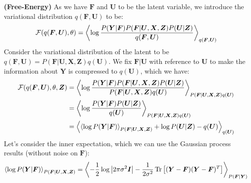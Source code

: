 \begin{remark}{\textbf{(Free-Energy)}}
    As we have $\boldsymbol F$ and $\boldsymbol U$ to be the latent variable, we introduce the variational distribution $q(\boldsymbol F, \boldsymbol U)$ to be:
    \begin{equation*}
        \mathcal{F}(q(\boldsymbol F, \boldsymbol U), \theta) = \left\langle \log\frac{P(\boldsymbol Y|\boldsymbol F)P(\boldsymbol F | \boldsymbol U, \boldsymbol X, \boldsymbol Z)P(\boldsymbol U | \boldsymbol Z)}{q(\boldsymbol F, \boldsymbol U)} \right\rangle_{q(\boldsymbol F, \boldsymbol U)}
    \end{equation*}
    Consider the variational distribution of the latent to be $q(\boldsymbol F, \boldsymbol U) = P(\boldsymbol F | \boldsymbol U, \boldsymbol X, \boldsymbol Z)q(\boldsymbol U)$. We fix $\boldsymbol F | \boldsymbol U$ with reference to $\boldsymbol U$ to make the information about $\boldsymbol Y$ is compressed to $q(\boldsymbol U)$, which we have:
    \begin{equation*}
    \begin{aligned}
        \mathcal{F}(q(\boldsymbol F, \boldsymbol U), \theta, \boldsymbol Z) &= \left\langle \log \frac{P(\boldsymbol Y|\boldsymbol F)P(\boldsymbol F | \boldsymbol U, \boldsymbol X, \boldsymbol Z)P(\boldsymbol U | \boldsymbol Z)}{P(\boldsymbol F | \boldsymbol U, \boldsymbol X, \boldsymbol Z)q(\boldsymbol U)} \right\rangle_{P(\boldsymbol F | \boldsymbol U, \boldsymbol X, \boldsymbol Z)q(\boldsymbol U)} \\
        &= \left\langle \log \frac{P(\boldsymbol Y|\boldsymbol F)P(\boldsymbol U | \boldsymbol Z)}{q(\boldsymbol U)} \right\rangle_{P(\boldsymbol F | \boldsymbol U, \boldsymbol X, \boldsymbol Z)q(\boldsymbol U)} \\
        &= \left\langle \left\langle \log P(\boldsymbol Y|\boldsymbol F) \right\rangle_{P(\boldsymbol F | \boldsymbol U, \boldsymbol X, \boldsymbol Z) } + \log P(\boldsymbol U | \boldsymbol Z) - q(\boldsymbol U) \right\rangle_{q(\boldsymbol U)}
    \end{aligned}
    \end{equation*}
    Let's consider the inner expectation, which we can use the Gaussian process results (without noise on $\boldsymbol F$):
    \begin{equation*}
    \begin{aligned}
        \brackd{\log P(\boldsymbol Y|\boldsymbol F)}_{P(\boldsymbol F | \boldsymbol U, \boldsymbol X, \boldsymbol Z) } &= \brackd{-\frac{1}{2}\log\abs{2\pi\sigma^2\boldsymbol I} - \frac{1}{2\sigma^2}\operatorname{Tr}\brackb{(\boldsymbol Y-\boldsymbol F)(\boldsymbol Y-\boldsymbol F)^T}}_{P(\boldsymbol F | \boldsymbol Y)} \\

\end{aligned}
\end{equation*}
\end{remark}

